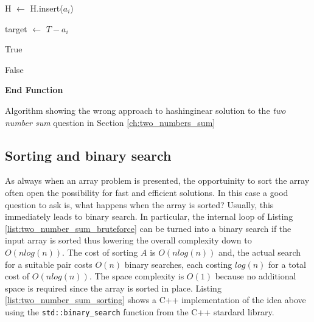 \begin{algorithm}
	 
	   
	
	{H $\longleftarrow$ \CreateHashSet \;
		 {H.insert($a_i$)\;}
		
		 {
			target $\leftarrow$ $T-a_i$ \;

			 {
				\Return	True
			}
		}
		\Return False\;
	}\textbf{End Function}
	\caption[Common mistake when solving the two number problem using hashing.]{Algorithm showing the wrong approach to hashinginear solution to the \textit{two number sum} question in Section
	\label{algo:two_numbers_sum_hashset_wrong}
	\ref{ch:two_numbers_sum} }
\end{algorithm}


\subsection{Sorting and binary search}
\label{sect:two_number_problem_binary_search}
As always when an array problem is presented, the opportuinity to sort the array often open the
possibility for fast and efficient solutions.
In this case a good question to ask is, what happens when the array is sorted? Usually, this immediately leads to binary search.
In particular, the internal loop of Listing \ref{list:two_number_sum_bruteforce} can be turned into a binary search if
the input array is sorted thus lowering the overall complexity down to $O(n log(n))$. 
The cost of sorting $A$ is $O(n log(n))$ and, the actual search for a suitable pair costs $O(n)$ binary
searches, each costing $log(n)$ for a total cost of $O(nlog(n))$. The space complexity is $O(1)$ because no additional space is
required since the array is sorted in place. 
Listing \ref{list:two_number_sum_sorting} shows a C++ implementation of the idea above using the
\texttt{std::binary\_search} function from the C++ stardard library.

\begin{minipage}{\linewidth}
	
\end{minipage}


